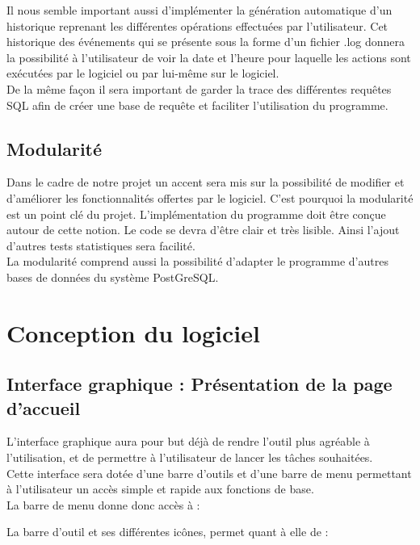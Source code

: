 \documentclass[a4paper,10pt]{report}
\begin{document}
Il nous semble important aussi d'implémenter la génération automatique d'un historique reprenant les différentes opérations effectuées par l'utilisateur. Cet historique des événements qui se présente sous la forme d'un fichier .log donnera la possibilité à l'utilisateur de voir la date et l'heure pour laquelle les actions sont exécutées par le logiciel ou par lui-même sur le logiciel. \\
De la même façon il sera important de garder la trace des différentes requêtes SQL afin de créer une base de requête et faciliter l'utilisation du programme.

\subsection{Modularité}

Dans le cadre de notre projet un accent sera mis sur la possibilité de modifier et d'améliorer les fonctionnalités offertes par le logiciel. C'est pourquoi la modularité est un point clé du projet. L'implémentation du programme doit être conçue autour de cette notion. Le code se devra d'être clair et très lisible. Ainsi l'ajout d'autres tests statistiques sera facilité. \\

La modularité comprend aussi la possibilité d'adapter le programme d'autres bases de données du système PostGreSQL.


\section{Conception du logiciel}

\subsection{Interface graphique : Présentation de la page d'accueil}

L'interface graphique aura pour but déjà de rendre l'outil plus agréable à l'utilisation, et de permettre à l'utilisateur de lancer les tâches souhaitées.\\

Cette interface sera dotée d'une barre d'outils et d’une barre de menu permettant à l'utilisateur un accès simple et rapide aux fonctions de base. \\

La barre de menu donne donc accès à :

La barre d’outil et ses différentes icônes, permet quant à elle de :
\end{document}
